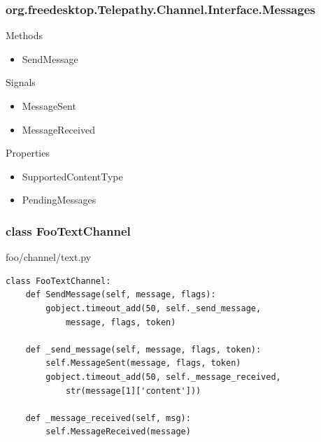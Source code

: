 \documentclass{beamer}
\begin{document}
\begin{frame}[fragile]
    \frametitle{org.freedesktop.Telepathy.Channel.Interface.Messages}

    \begin{block}{Methods}
    \begin{itemize}
    \item SendMessage
    \end{itemize}
    \end{block}

    \begin{block}{Signals}
    \begin{itemize}
    \item MessageSent
    \item MessageReceived
    \end{itemize}
    \end{block}

    \begin{block}{Properties}
    \begin{itemize}
    \item SupportedContentType
    \item PendingMessages
    \end{itemize}
    \end{block}
\end{frame}

\begin{frame}[fragile]
    \frametitle{class FooTextChannel}
    \begin{block}{foo/channel/text.py}
    \begin{verbatim}
class FooTextChannel:
    def SendMessage(self, message, flags):
        gobject.timeout_add(50, self._send_message,
            message, flags, token)

    def _send_message(self, message, flags, token):
        self.MessageSent(message, flags, token)
        gobject.timeout_add(50, self._message_received, 
            str(message[1]['content']))

    def _message_received(self, msg):
        self.MessageReceived(message)
    \end{verbatim}
    \end{block}
\end{frame}
\end{document}
